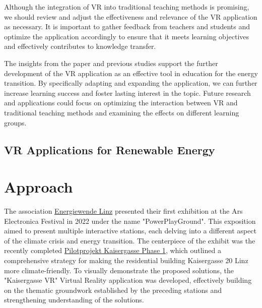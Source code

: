 \documentclass[draft, final]{vutinfth} %
\begin{document}
Although the integration of VR into traditional teaching methods is promising, we should review and adjust the effectiveness and relevance of the VR application as necessary. It is important to gather feedback from teachers and students and optimize the application accordingly to ensure that it meets learning objectives and effectively contributes to knowledge transfer.

The insights from the paper and previous studies support the further development of the VR application as an effective tool in education for the energy transition. By specifically adapting and expanding the application, we can further increase learning success and foster lasting interest in the topic. Future research and applications could focus on optimizing the interaction between VR and traditional teaching methods and examining the effects on different learning groups.


\section{VR Applications for Renewable Energy}


\chapter{Approach}

The association \href{https://www.energiewende-linz.at}{Energiewende Linz} presented their first exhibition at the Ars Electronica Festival in 2022 under the name "PowerPlayGround". This exposition aimed to present multiple interactive stations, each delving into a different aspect of the climate crisis and energy transition. The centerpiece of the exhibit was the recently completed \href{https://www.pilotprojekt-kaisergasse.at/}{Pilotprojekt Kaisergasse Phase 1}, which outlined a comprehensive strategy for making the residential building Kaisergasse 20 Linz more climate-friendly. To visually demonstrate the proposed solutions, the "Kaisergasse VR" Virtual Reality application was developed, effectively building on the thematic groundwork established by the preceding stations and strengthening understanding of the solutions.
\end{document}
